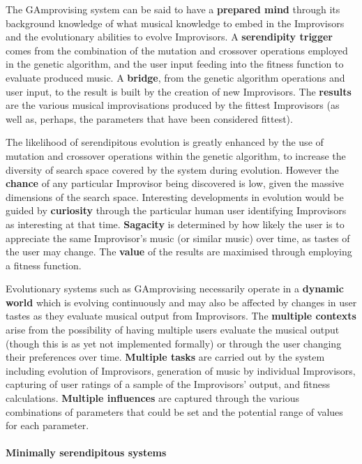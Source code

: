 The GAmprovising system can be said to have a \textbf{prepared mind} through its background knowledge of what musical knowledge to embed in the Improvisors and the evolutionary abilities to evolve Improvisors. A \textbf{serendipity trigger} comes from the combination of the mutation and crossover operations employed in the genetic algorithm, and the user input feeding into the fitness function to evaluate produced music. A \textbf{bridge}, from the genetic algorithm operations and user input, to the result is built by the creation of new Improvisors. The \textbf{results} are the various musical improvisations produced by the fittest Improvisors (as well as, perhaps, the parameters that have been considered fittest).

The likelihood of serendipitous evolution is greatly enhanced by the use of mutation and crossover operations within the genetic algorithm, to increase the diversity of search space covered by the system during evolution. However the \textbf{chance} of any particular Improvisor being discovered is low, given the massive dimensions of the search space.  Interesting developments in evolution would be guided by \textbf{curiosity} through the particular human user identifying Improvisors as interesting at that time. \textbf{Sagacity} is determined by how likely the user is to appreciate the same Improvisor's music (or similar music) over time, as tastes of the user may change. The \textbf{value} of the results are maximised through employing a fitness function.

Evolutionary systems such as GAmprovising necessarily operate in a \textbf{dynamic world} which is evolving continuously and may also be affected by changes in user tastes as they evaluate musical output from Improvisors. The \textbf{multiple contexts} arise from the possibility of having multiple users evaluate the musical output (though this is as yet not implemented formally) or through the user changing their preferences over time. \textbf{Multiple tasks} are carried out by the system including evolution of Improvisors, generation of music by individual Improvisors, capturing of user ratings of a sample of the Improvisors' output, and fitness calculations. \textbf{Multiple influences} are captured through the various combinations of parameters that could be set and the potential range of values for each parameter.

\paragraph{Minimally serendipitous systems}

